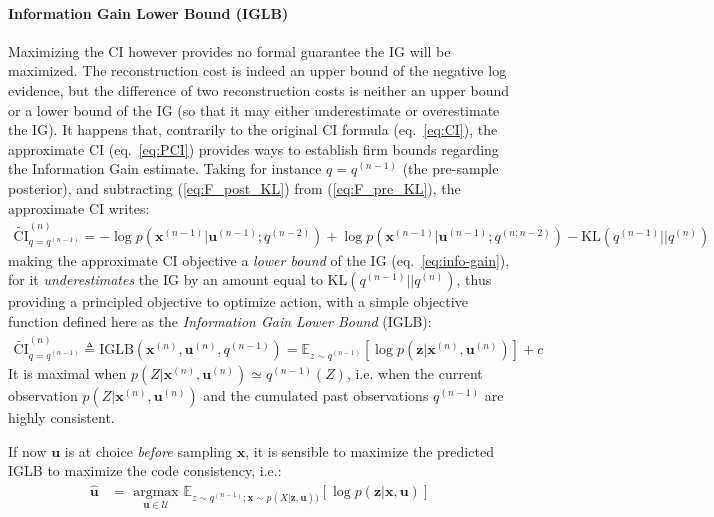 \documentclass[12pt,twoside,openright]{article}
\begin{document}
\paragraph{Information Gain Lower Bound (IGLB)}
{\color{Purple} Maximizing the CI however provides no formal guarantee the IG will be maximized. The reconstruction cost is indeed an upper bound of the negative log evidence, but the difference of two reconstruction costs is neither an upper bound or a lower bound of the IG (so  that it may either underestimate or overestimate the IG). It happens that, contrarily to the original CI formula (eq.~\ref{eq:CI}), the approximate CI (eq.~\ref{eq:PCI}) provides ways to establish firm bounds regarding the Information Gain estimate.}
{\color{Purple}Taking for instance $q= q^{(n-1)}$ (the pre-sample posterior), and subtracting (\ref{eq:F_post_KL}) from (\ref{eq:F_pre_KL}), the approximate CI writes:}
\begin{align}
	\tilde{\text{CI}}^{(n)}_{q = q^{(n-1)}} = 
	-\log p(\boldsymbol{x}^{(n-1)}|\boldsymbol{u}^{(n-1)}; q^{(n-2)}) 
	+ \log p(\boldsymbol{x}^{(n-1)}|\boldsymbol{u}^{(n-1)}; q^{(n;n-2)}) - \text{KL} (q^{(n-1)}||q^{(n)})
\end{align}
making the approximate CI objective {\color{Purple}a \emph{lower bound} of the IG (eq.~\ref{eq:info-gain}), for it} \emph{underestimates} the IG by an amount equal to $\text{KL} (q^{(n-1)}||q^{(n)})$, thus providing a {\color{Purple} principled objective} to optimize action, with  a simple objective function defined here as the {\color{Purple}\emph{Information Gain Lower Bound} (IGLB)}:
\begin{align}
	\tilde{\text{CI}}^{(n)}_{q = q^{(n-1)}} 
	\triangleq \text{IGLB}(\boldsymbol{x}^{(n)}, \boldsymbol{u}^{(n)}, q^{(n-1)})
	= \mathbb{E}_{z\sim q^{(n-1)}} \left[\log p(\boldsymbol{z}|\boldsymbol{x}^{(n)}, \boldsymbol{u}^{(n)})\right] + c\label{eq:PCI-n-1}
\end{align}
It is maximal when $p(Z|\boldsymbol{x}^{(n)}, \boldsymbol{u}^{(n)})\simeq q^{(n-1)}(Z)$, i.e. when {\color{Purple} the current observation} $p(Z|\boldsymbol{x}^{(n)}, \boldsymbol{u}^{(n)})$ and {\color{Purple} the cumulated past observations} $q^{(n-1)}$ are highly consistent.

If now $\boldsymbol{u}$ is at choice \emph{before} sampling  $\boldsymbol{x}$, it is sensible to maximize the predicted {\color{Purple} IGLB} to maximize the code consistency, i.e.:
\begin{align}
	\hat{\boldsymbol{u}} 
	&= \underset{\boldsymbol{u} \in \mathcal{U}}{\text{ argmax }} \mathbb{E}_{z\sim q^{(n-1)}; \boldsymbol{x}\sim p(X|\boldsymbol{z},\boldsymbol{u}))} 
	\left[\log p(\boldsymbol{z}|\boldsymbol{x}, \boldsymbol{u})\right]\label{eq:LC-pred}
\end{align}
\end{document}
